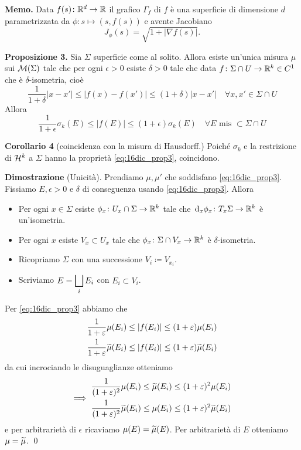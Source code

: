 \textbf{Memo.} Data $f(s) \colon \mathbb R^d \to \mathbb R$ il grafico $\Gamma_f$ di $f$ è una superficie di dimensione $d$ parametrizzata da $\phi \colon s \mapsto (s,f(s))$ e avente Jacobiano
$$
	J_\phi(s) = \sqrt{1 + |\nabla f(s)|}.
$$

\vss

\textbf{Proposizione 3.} Sia $\Sigma$ superficie come al solito. Allora esiste un'unica misura $\mu$ sui $\mathcal{M}(\Sigma)$ tale che per ogni $\epsilon > 0$ esiste $\delta > 0$ tale che data $f \colon \Sigma \cap U \to \mathbb R^k \in C^1$ che è $\delta$-isometria, cioè
%
\begin{equation}
	\label{eq:16dic_prop3} \tag{P}
	\frac{1}{1 + \delta} |x-x'| \leq |f(x) - f(x')| \leq (1+\delta)|x-x'| \quad \forall x,x' \in \Sigma \cap U
\end{equation}
Allora
%
$$
	\frac{1}{1+\epsilon} \sigma_k(E) \leq |f(E)| \leq (1+\epsilon)\sigma_k(E) \quad \forall E \text{ mis } \subset \Sigma \cap U
$$
%

\textbf{Corollario 4} (coincidenza con la misura di Hausdorff.) Poiché $\sigma_k$ e la restrizione di $\mathcal{H}^k$ a $\Sigma$ hanno la proprietà \eqref{eq:16dic_prop3}, coincidono.

\textbf{Dimostrazione} (Unicità). 
Prendiamo $\mu,\mu'$ che soddisfano \eqref{eq:16dic_prop3}.
Fissiamo $E,\epsilon > 0$ e $\delta$ di conseguenza usando \eqref{eq:16dic_prop3}. Allora
\begin{itemize}

	\item Per ogni $x \in \Sigma$ esiste $\phi_x \colon U_x \cap \Sigma \to \mathbb R^k$ tale che $\,\mathrm{d}_x \phi_x \colon T_x \Sigma \to \mathbb R^k$ è un'isometria.


	\item Per ogni $x$ esiste $V_x \subset U_x$ tale che $\phi_x \colon \Sigma \cap V_x \to \mathbb R^k$ è $\delta$-isometria.


	\item Ricopriamo $\Sigma$ con una successione $V_i \coloneqq V_{x_i}$.


	\item Scriviamo $\displaystyle E = \bigsqcup_i E_i$ con $E_i \subset V_i$.

\end{itemize}
 
Per \eqref{eq:16dic_prop3} abbiamo che
%
\begin{gather*}
	\frac{1}{1+\varepsilon} \mu(E_i) \leq |f(E_i)| \leq (1+\varepsilon) \mu(E_i) \\
	\frac{1}{1+\varepsilon} \widetilde{\mu}(E_i) \leq |f(E_i)| \leq (1+\varepsilon) \widetilde{\mu}(E_i)
\end{gather*}
da cui incrociando le disuguaglianze otteniamo
$$
\Longrightarrow \;
\begin{gathered}
	\frac{1}{(1+\varepsilon)^2} \mu(E_i) \leq \widetilde \mu(E_i) \leq (1+\varepsilon)^2 \mu(E_i) \\
	\frac{1}{(1+\varepsilon)^2} \widetilde \mu(E_i) \leq \mu(E_i) \leq (1+\varepsilon)^2 \widetilde \mu(E_i)
\end{gathered}
$$
e per arbitrarietà di $\epsilon$ ricaviamo $\mu(E) = \widetilde{\mu}(E)$. Per arbitrarietà di $E$ otteniamo $\mu = \widetilde{\mu}$.
\qed


